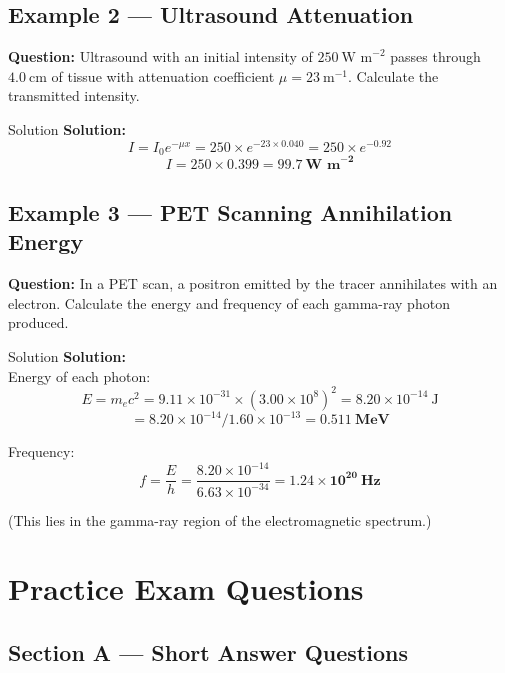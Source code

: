\subsection*{Example 2 — Ultrasound Attenuation}

\textbf{Question:} Ultrasound with an initial intensity of $250\ \text{W m}^{-2}$ passes through $4.0\ \text{cm}$ of tissue with attenuation coefficient $\mu = 23\ \text{m}^{-1}$. Calculate the transmitted intensity.

\begin{examplebox}{Solution}
\textbf{Solution:}\\
$$I = I_0 e^{-\mu x} = 250 \times e^{-23 \times 0.040} = 250 \times e^{-0.92}$$
$$I = 250 \times 0.399 = \mathbf{99.7\ \text{W m}^{-2}}$$
\end{examplebox}

\subsection*{Example 3 — PET Scanning Annihilation Energy}

\textbf{Question:} In a PET scan, a positron emitted by the tracer annihilates with an electron. Calculate the energy and frequency of each gamma-ray photon produced.

\begin{examplebox}{Solution}
\textbf{Solution:}\\
Energy of each photon:
$$E = m_e c^2 = 9.11\times10^{-31} \times (3.00\times10^8)^2 = 8.20\times10^{-14}\ \text{J}$$
$$= 8.20\times10^{-14} / 1.60\times10^{-13} = \mathbf{0.511\ \text{MeV}}$$

Frequency:
$$f = \frac{E}{h} = \frac{8.20\times10^{-14}}{6.63\times10^{-34}} = \mathbf{1.24\times10^{20}\ \text{Hz}}$$

(This lies in the gamma-ray region of the electromagnetic spectrum.)
\end{examplebox}

\section{Practice Exam Questions}

\subsection*{Section A — Short Answer Questions}

